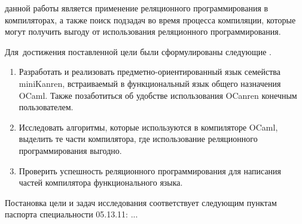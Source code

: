 


{\aim} данной работы является применение реляционного программирования в компиляторах, а также поиск подзадач во время процесса компиляции, которые могут получить выгоду от использования реляционного программирования.

Для~достижения поставленной цели были сформулированы следующие {\tasks}.
\begin{enumerate}
  \item Разработать и реализовать предметно-ориентированный язык семейства miniKanren, встраиваемый в функциональный язык общего назначения  OCaml. Также позаботиться об удобстве использования OCanren конечным пользователем.
  \item Исследовать алгоритмы, которые используются в компиляторе OCaml, выделить те части компилятора, где использование реляционного программирования выгодно.
  \item Проверить успешность реляционного программирования для написания частей компилятора функционального языка.
\end{enumerate}

Постановка цели и задач исследования соответствует 
следующим пунктам паспорта специальности 05.13.11: ...

